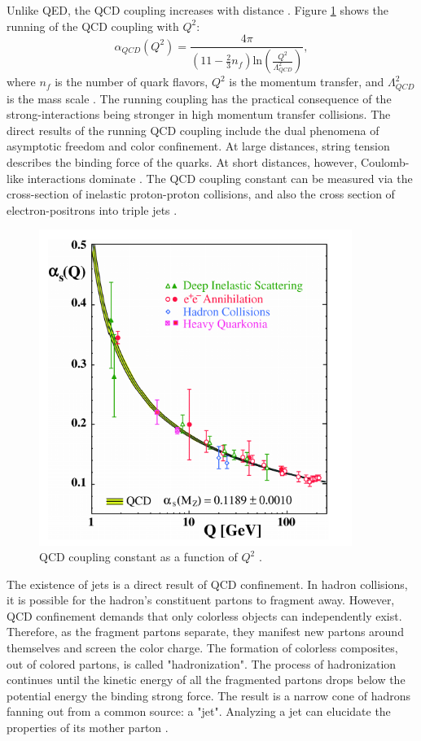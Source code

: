 Unlike QED, the QCD coupling increases with distance \cite{Bethke:2006ac}. Figure \ref{fig:runningQCDCoupling} shows the running of the QCD coupling with $Q^2$:
\begin{equation}
\alpha_{QCD}(Q^2) = \frac{4 \pi }{(11 - \frac{2}{3}n_f)\mathrm{ln}(\frac{Q^2}{\Lambda^2_{QCD}}) } ,
\end{equation}
where $n_f$ is the number of quark flavors, $Q^2$ is the momentum transfer, and  $\Lambda^2_{QCD}$ is the mass scale \cite{Deur:2016tte}. The running coupling has the practical consequence of the strong-interactions being stronger in high momentum transfer collisions. The direct results of the running QCD coupling include the dual phenomena of asymptotic freedom and color confinement. At large distances, string tension describes the binding force of the quarks. At short distances, however, Coulomb-like interactions dominate \cite{Bjorken:1968dy}. The QCD coupling constant can be measured via the cross-section of inelastic proton-proton collisions, and also the cross section of electron-positrons into triple jets \cite{Thomson:2013zua}. 
\begin{figure}[h!]
\begin{centering}
\includegraphics[width=4in]{Chapter1/importfigs/qcd_coupling_bethke.png}
\par\end{centering}
\caption{QCD coupling constant as a function of $Q^2$ \cite{Bethke:2006ac}. \label{fig:runningQCDCoupling}}
\end{figure}

The existence of jets is a direct result of QCD confinement. In hadron collisions, it is possible for the hadron's constituent partons to fragment away. However, QCD confinement demands that only colorless objects can independently exist. Therefore, as the fragment partons separate, they manifest new partons around themselves and screen the color charge. The formation of colorless composites, out of colored partons, is called "hadronization". The process of hadronization continues until the kinetic energy of all the fragmented partons drops below the potential energy the binding strong force. The result is a narrow cone of hadrons fanning out from a common source: a "jet". Analyzing a jet can elucidate the properties of its mother parton \cite{d'Enterria:2004nv}.  

